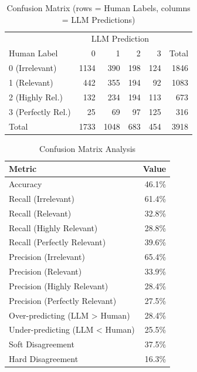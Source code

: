 \begin{table}[htbp]
\centering
\caption{Confusion Matrix (rows = Human Labels, columns = LLM Predictions)}
\label{tab:confusion-matrix}
\begin{tabular}{l|rrrr|r}
\toprule
 & \multicolumn{4}{c|}{LLM Prediction} & \\
Human Label & 0 & 1 & 2 & 3 & Total \\
\midrule
0 (Irrelevant) & 1134 & 390 & 198 & 124 & 1846 \\
1 (Relevant) & 442 & 355 & 194 & 92 & 1083 \\
2 (Highly Rel.) & 132 & 234 & 194 & 113 & 673 \\
3 (Perfectly Rel.) & 25 & 69 & 97 & 125 & 316 \\
\midrule
Total & 1733 & 1048 & 683 & 454 & 3918 \\
\bottomrule
\end{tabular}
\end{table}


\begin{table}[htbp]
\centering
\caption{Confusion Matrix Analysis}
\label{tab:confusion-analysis}
\begin{tabular}{lr}
\toprule
Metric & Value \\
\midrule
Accuracy & 46.1\% \\
\midrule
Recall (Irrelevant) & 61.4\% \\
Recall (Relevant) & 32.8\% \\
Recall (Highly Relevant) & 28.8\% \\
Recall (Perfectly Relevant) & 39.6\% \\
\midrule
Precision (Irrelevant) & 65.4\% \\
Precision (Relevant) & 33.9\% \\
Precision (Highly Relevant) & 28.4\% \\
Precision (Perfectly Relevant) & 27.5\% \\
\midrule
Over-predicting (LLM > Human) & 28.4\% \\
Under-predicting (LLM < Human) & 25.5\% \\
\midrule
Soft Disagreement & 37.5\% \\
Hard Disagreement & 16.3\% \\
\bottomrule
\end{tabular}
\end{table}